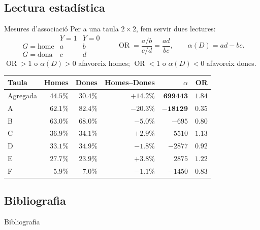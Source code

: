 \documentclass{bestbeamer}
\begin{document}
\subsection{Lectura estadística}
\begin{frame}{Mesures d'associació}
  \footnotesize
  Per a una taula $2\times2$, fem servir dues lectures:
  \[
  \begin{array}{c|cc}
     & Y=1 & Y=0\\ \hline
    G=\text{home} & a & b\\
    G=\text{dona} & c & d
  \end{array}\qquad
    \operatorname{OR}=\frac{a/b}{c/d}=\frac{ad}{bc},
    \qquad
    \alpha(D)=ad-bc.
  \]
  $\operatorname{OR}>1$ o $\alpha(D)>0$ afavoreix homes; $\operatorname{OR}<1$ o $\alpha(D)<0$ afavoreix dones.
  \vspace{1mm}
  \begin{center}
  \setlength{\tabcolsep}{4.4pt}
  \renewcommand{\arraystretch}{1.12}
  \begin{tabular}{@{}lrrrrr@{}}
    \toprule
    Taula & Homes & Dones & Homes--Dones & $\alpha$ & OR  \\
    \midrule
    Agregada & $44.5\%$ & $30.4\%$ & $\mathbf{+14.2\%}$ & $\mathbf{699443}$ & $\mathbf{1.84}$ \\
    A & $62.1\%$ & $82.4\%$ & $\mathbf{-20.3\%}$ & $\mathbf{-18129}$ & $\mathbf{0.35}$ \\
    B & $63.0\%$ & $68.0\%$ & $-5.0\%$ & $-695$ & $0.80$ \\
    C & $36.9\%$ & $34.1\%$ & $+2.9\%$ & $5510$ & $1.13$ \\
    D & $33.1\%$ & $34.9\%$ & $-1.8\%$ & $-2877$ & $0.92$ \\
    E & $27.7\%$ & $23.9\%$ & $+3.8\%$ & $2875$ & $1.22$ \\
    F & $5.9\%$ & $7.0\%$ & $-1.1\%$ & $-1450$ & $0.83$ \\
    \bottomrule
  \end{tabular}
  \end{center}
\end{frame}


\begin{frame}[plain]
  \titlepage
\end{frame}

\subsection{Bibliografia}

\begin{frame}[allowframebreaks]{Bibliografia}
  \scriptsize
  \setlength{\bibitemsep}{2pt}
  \printbibliography[heading=none]
\end{frame}
\end{document}
